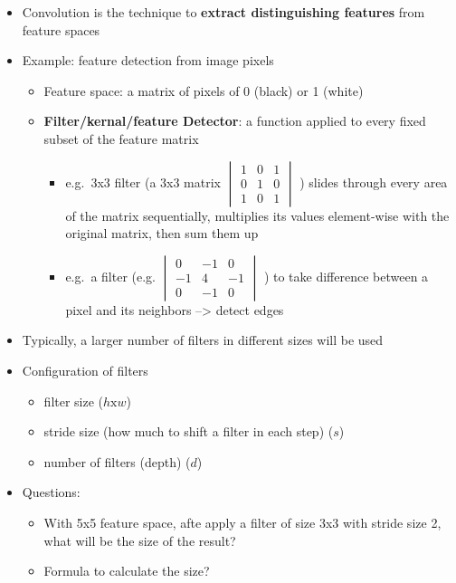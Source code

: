 \documentclass[11pt]{article}
\providecommand{\tightlist}{%
      \setlength{\itemsep}{0pt}\setlength{\parskip}{0pt}}
\begin{document}
\begin{itemize}
\tightlist
\item
  Convolution is the technique to \textbf{extract distinguishing
  features} from feature spaces
\item
  Example: feature detection from image pixels

  \begin{itemize}
  \tightlist
  \item
    Feature space: a matrix of pixels of 0 (black) or 1 (white)
  \item
    \textbf{Filter/kernal/feature Detector}: a function applied to every
    fixed subset of the feature matrix

    \begin{itemize}
    \tightlist
    \item
      e.g.~3x3 filter (a 3x3 matrix
      \(\begin{vmatrix} 1 & 0 & 1 \\ 0 & 1 & 0 \\ 1 & 0 & 1 \end{vmatrix}\)
      ) slides through every area of the matrix sequentially, multiplies
      its values element-wise with the original matrix, then sum them up
    \item
      e.g.~a filter (e.g.
      \(\begin{vmatrix} 0 & -1 & 0 \\ -1 & 4 & -1 \\ 0 & -1 & 0 \end{vmatrix}\)
      ) to take difference between a pixel and its neighbors
      --\textgreater{} detect edges 
    \end{itemize}
  \end{itemize}
\item
  Typically, a larger number of filters in different sizes will be used
\item
  Configuration of filters

  \begin{itemize}
  \tightlist
  \item
    filter size (\(h \text{x} w\))
  \item
    stride size (how much to shift a filter in each step) (\(s\))
  \item
    number of filters (depth) (\(d\))
  \end{itemize}
\item
  Questions:

  \begin{itemize}
  \tightlist
  \item
    With 5x5 feature space, afte apply a filter of size 3x3 with stride
    size 2, what will be the size of the result?
  \item
    Formula to calculate the size?
  \end{itemize}
\end{itemize}
\end{document}

